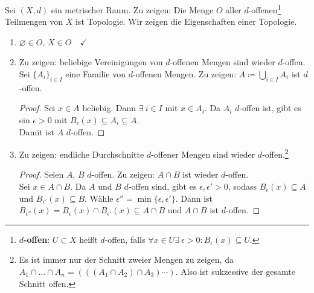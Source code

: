 \begin{problem*}[1]
  Sei \( (X, d) \) ein metrischer Raum. Zu zeigen: Die Menge \( O \) aller \( d \)-offenen\footnote{\textbf{ \( d \)-offen}: \( U \subset X \) heißt \( d \)-offen, falls \( \forall x \in U \exists \ \epsilon > 0 : B_\epsilon(x) \subseteq U \).} Teilmengen von \( X \) ist Topologie. Wir zeigen die Eigenschaften einer Topologie.
  \begin{enumerate}
    \item \( \varnothing \in O \), \( X \in O \quad \checkmark \)
    \item Zu zeigen: beliebige Vereinigungen von \( d \)-offenen Mengen sind wieder \( d \)-offen. \\
    Sei \( {\{ A_i \}}_{i \in I} \) eine Familie von \( d \)-offenen Mengen. Zu zeigen: \( A \coloneqq \bigcup_{i \in I}A_i \) ist \( d \)-offen.
    \begin{proof}
      Sei \( x \in A \) beliebig. Dann \( \exists \ i \in I \) mit \( x \in A_i \). Da \( A_i \) \( d \)-offen ist, gibt es ein \( \epsilon > 0 \) mit \( B_\epsilon(x) \subseteq A_i \subseteq A \). \\
      Damit ist \( A \) \( d \)-offen.
    \end{proof}
    
    \item Zu zeigen: endliche Durchschnitte \( d \)-offener Mengen sind wieder \( d \)-offen.\footnote{Es ist immer nur der Schnitt zweier Mengen zu zeigen, da \( A_1 \cap \dots \cap A_n = \left(\left(\left( A_1 \cap A_2 \right) \cap A_3 \right) \cdots \right) \). Also ist sukzessive der gesamte Schnitt offen.}
    \begin{proof}
      Seien \( A \), \( B \) \( d \)-offen. Zu zeigen: \( A \cap B \) ist wieder \( d \)-offen. \\
      Sei \( x \in A \cap B \). Da \( A \) und \( B \) \( d \)-offen sind, gibt es \( \epsilon, \epsilon' > 0 \), sodass \( B_\epsilon(x) \subseteq A \) und \( B_{\epsilon'}(x) \subseteq B \). Wähle \( \epsilon'' = \min \{ \epsilon, \epsilon' \} \). Dann ist \( B_{\epsilon''}(x) = B_\epsilon(x) \cap B_{\epsilon'}(x) \subseteq A \cap B \) und \( A \cap B \) ist \( d \)-offen.
    \end{proof}
  \end{enumerate}
\end{problem*}

